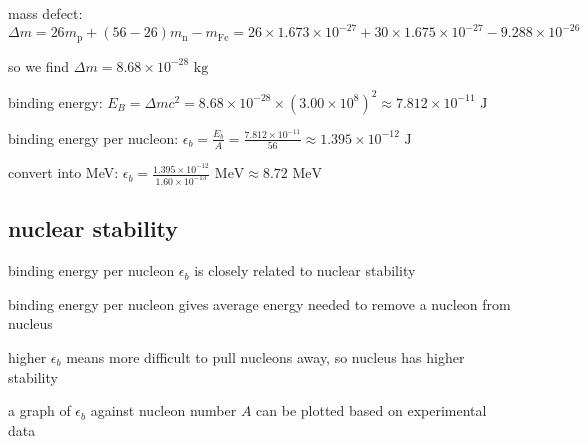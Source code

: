 
\begin{soln} mass defect: $\Delta m = 26m_\text{p} + (56-26)m_\text{n} - m_\text{Fe} = 26\times 1.673\times10^{-27} + 30 \times1.675\times10^{-27} - 9.288 \times 10^{-26}$

so we find $\Delta m = 8.68 \times 10^{-28} \text{ kg}$

binding energy: $E_B = \Delta m c^2 = 8.68 \times 10^{-28} \times (3.00\times10^8)^2 \approx 7.812 \times 10^{-11} \text{ J}$

binding energy per nucleon: $\epsilon_b = \frac{E_b}{A} = \frac{7.812 \times 10^{-11}}{56} \approx 1.395 \times 10^{-12} \text{ J}$

\eqyskip convert into MeV: $\epsilon_b = \frac{1.395 \times 10^{-12}}{1.60\times10^{-13}} \text{ MeV} \approx 8.72 \text{ MeV}$ \end{soln}





\subsection{nuclear stability}

binding energy per nucleon $\epsilon_b$ is closely related to nuclear stability

binding energy per nucleon gives average energy needed to remove a nucleon from nucleus

higher $\epsilon_b$ means more difficult to pull nucleons away, so nucleus has higher stability

a graph of $\epsilon_b$ against nucleon number $A$ can be plotted based on experimental data

